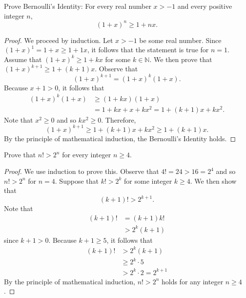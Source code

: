 \documentclass[12pt]{article}
\newcommand{\N}{\mathbb{N}}
\newenvironment{problem}[2][Problem]{\begin{trivlist}
		\item[\hskip \labelsep {\bfseries #1}\hskip \labelsep {\bfseries #2.}]}{\end{trivlist}}
\begin{document}
\begin{problem}{24}
	Prove Bernoulli's Identity: For every real number $x>-1$ and every positive integer $n$,
	\begin{equation*}
		(1+x)^{n} \geq 1+nx.
	\end{equation*}
\begin{proof}
	We proceed by induction. Let $x>-1$ be some real number. Since $(1+x)^{1} = 1 + x \geq 1+1x$, it follows that the statement is true for $n=1$. Assume that $(1+x)^{k} \geq 1+kx$ for some $k\in \N$. We then prove that $(1+x)^{k+1} \geq 1+(k+1)x$. Observe that
	\begin{equation*}
		(1+x)^{k+1} = (1+x)^{k} (1+x).
	\end{equation*}
Because $x+1>0$, it follows that
\begin{align*}
	(1+x)^{k}(1+x) &\geq (1+kx)(1+x)\\
	&= 1+kx+x+kx^{2} = 1+ (k+1)x + kx^{2}.
\end{align*}
Note that $x^{2}\geq 0$ and so $kx^{2} \geq 0$. Therefore, 
\begin{equation*}
	(1+x)^{k+1} \geq 1+ (k+1)x + kx^{2} \geq 1+(k+1)x.
\end{equation*}
By the principle of mathematical induction, the Bernoulli's Identity holds.  
\end{proof}
\end{problem}
 
\begin{problem}{25}
	Prove that $n! > 2^{n}$ for every integer $n\geq 4$.
\begin{proof}
	We use induction to prove this. Observe that $4! = 24 > 16 = 2^{4}$ and so $n! > 2^{n}$ for $n = 4$. Suppose that $k! > 2^{k}$ for some integer $k\geq 4$. We then show that
	\begin{equation*}
		(k+1)! > 2^{k+1}.
	\end{equation*}
Note that
\begin{align*}
	(k+1)! &= (k+1)k!\\  
	&> 2^{k}(k+1)
\end{align*}
since $k+1 > 0$. Because $k+1 \geq 5$, it follows that
\begin{align*}
	(k+1)! &> 2^{k}(k+1) \\
	&\geq 2^{k}\cdot 5 \\
	&> 2^{k}\cdot 2 = 2^{k+1}
\end{align*}
By the principle of mathematical induction, $n!> 2^{n}$ holds for any integer $n\geq 4$.
\end{proof}
\end{problem}
\end{document}
